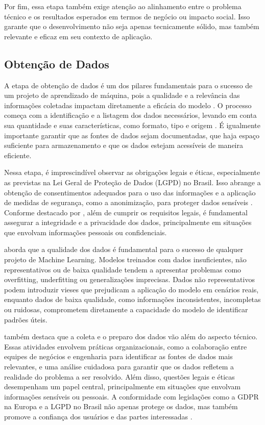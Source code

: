 Por fim, essa etapa também exige atenção ao alinhamento entre o problema técnico e os resultados esperados em termos de negócio ou impacto social. Isso garante que o desenvolvimento não seja apenas tecnicamente sólido, mas também relevante e eficaz em seu contexto de aplicação.

\subsection{Obtenção de Dados}
A etapa de obtenção de dados é um dos pilares fundamentais para o sucesso de um projeto de aprendizado de máquina, pois a qualidade e a relevância das informações coletadas impactam diretamente a eficácia do modelo \cite{geron2017}. O processo começa com a identificação e a listagem dos dados necessários, levando em conta sua quantidade e suas características, como formato, tipo e origem \cite{geron2017}. É igualmente importante garantir que as fontes de dados sejam documentadas, que haja espaço suficiente para armazenamento e que os dados estejam acessíveis de maneira eficiente.

Nessa etapa, é imprescindível observar as obrigações legais e éticas, especialmente as previstas na Lei Geral de Proteção de Dados (LGPD) no Brasil. Isso abrange a obtenção de consentimentos adequados para o uso das informações e a aplicação de medidas de segurança, como a anonimização, para proteger dados sensíveis \cite{muller2017}. Conforme destacado por , além de cumprir os requisitos legais, é fundamental assegurar a integridade e a privacidade dos dados, principalmente em situações que envolvam informações pessoais ou confidenciais.

 aborda que a qualidade dos dados é fundamental para o sucesso de qualquer projeto de Machine Learning. Modelos treinados com dados insuficientes, não representativos ou de baixa qualidade tendem a apresentar problemas como overfitting, underfitting ou generalizações imprecisas. Dados não representativos podem introduzir vieses que prejudicam a aplicação do modelo em cenários reais, enquanto dados de baixa qualidade, como informações inconsistentes, incompletas ou ruidosas, comprometem diretamente a capacidade do modelo de identificar padrões úteis.

 também destaca que a coleta e o preparo dos dados vão além do aspecto técnico. Essas atividades envolvem práticas organizacionais, como a colaboração entre equipes de negócios e engenharia para identificar as fontes de dados mais relevantes, e uma análise cuidadosa para garantir que os dados refletem a realidade do problema a ser resolvido. Além disso, questões legais e éticas desempenham um papel central, principalmente em situações que envolvam informações sensíveis ou pessoais. A conformidade com legislações como a GDPR na Europa e a LGPD no Brasil não apenas protege os dados, mas também promove a confiança dos usuários e das partes interessadas \cite{geron2017}.

